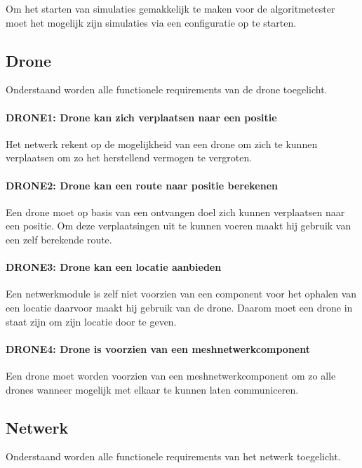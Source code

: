 \documentclass[a4paper, 11pt, oneside]{report}
\begin{document}
Om het starten van simulaties gemakkelijk te maken voor de algoritmetester moet het mogelijk zijn simulaties via een configuratie op te starten.


\subsection{Drone}
Onderstaand worden alle functionele requirements van de drone toegelicht.
\paragraph{DRONE1: Drone kan zich verplaatsen naar een positie}
\hypertarget{DRONE1}{}

Het netwerk rekent op de mogelijkheid van een drone om zich te kunnen verplaatsen om zo het herstellend vermogen te vergroten.

\paragraph{DRONE2: Drone kan een route naar positie berekenen}
\hypertarget{DRONE2}{}

Een drone moet op basis van een ontvangen doel zich kunnen verplaatsen naar een positie. Om deze verplaatsingen uit te kunnen voeren maakt hij gebruik van een zelf berekende route.

\paragraph{DRONE3: Drone kan een locatie aanbieden}
\hypertarget{DRONE3}{}

Een netwerkmodule is zelf niet voorzien van een component voor het ophalen van een locatie daarvoor maakt hij gebruik van de drone. Daarom moet een drone in staat zijn om zijn locatie door te geven.

\paragraph{DRONE4: Drone is voorzien van een meshnetwerkcomponent}
\hypertarget{DRONE4}{}

Een drone moet worden voorzien van een meshnetwerkcomponent om zo alle drones wanneer mogelijk met elkaar te kunnen laten communiceren.

\subsection{Netwerk}
Onderstaand worden alle functionele requirements van het netwerk toegelicht.
\end{document}
